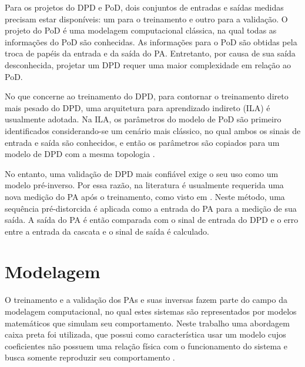 
Para os projetos do DPD e PoD, dois conjuntos de entradas e saídas medidas precisam estar disponíveis: um para o treinamento e outro para a validação. O projeto do PoD é uma modelagem computacional clássica, na qual todas as informações do PoD são conhecidas. As informações para o PoD são obtidas pela troca de papéis da entrada e da saída do PA. Entretanto, por causa de sua saída desconhecida, projetar um DPD requer uma maior complexidade em relação ao PoD.

No que concerne ao treinamento do DPD, para contornar o treinamento direto mais pesado do DPD, uma arquitetura para aprendizado indireto (ILA) é usualmente adotada. Na ILA, os parâmetros do modelo de PoD são primeiro identificados considerando-se um cenário mais clássico, no qual ambos os sinais de entrada e saída são conhecidos, e então os parâmetros são copiados para um modelo de DPD com a mesma topologia \cite{changsoo_eun_new_1997}.

No entanto, uma validação de DPD mais confiável exige o seu uso como um modelo pré-inverso. Por essa razão, na literatura é usualmente requerida uma nova medição do PA após o treinamento, como visto em \cite{8891388}. Neste método, uma sequência pré-distorcida é aplicada como a entrada do PA para a medição de sua saída. A saída do PA é então comparada com o sinal de entrada do DPD e o erro entre a entrada da cascata e o sinal de saída é calculado.

\section{Modelagem} \label{sec:fundteo-model}
O treinamento e a validação dos PAs e suas inversas fazem parte do campo da modelagem computacional, no qual estes sistemas são representados por modelos matemáticos que simulam seu comportamento. Neste trabalho uma abordagem caixa preta foi utilizada, que possui como característica usar um modelo cujos coeficientes não possuem uma relação física com o funcionamento do sistema e busca somente reproduzir seu comportamento \cite{8882211}.


